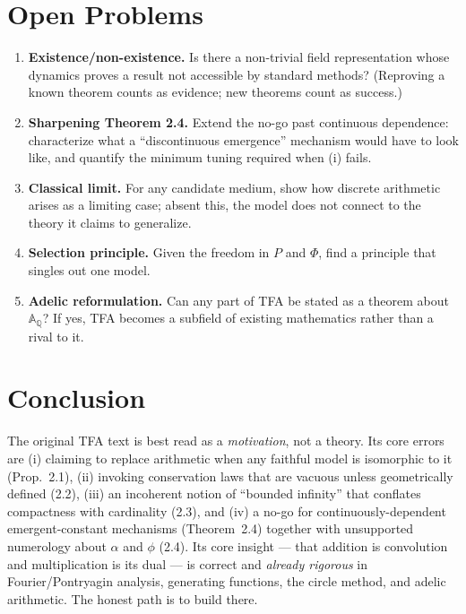 \documentclass[11pt]{article}
\begin{document}
\section{Open Problems}

\begin{enumerate}[leftmargin=1.6em]
\item \textbf{Existence/non-existence.} Is there a non-trivial field
representation whose dynamics proves a result not accessible by standard methods?
(Reproving a known theorem counts as evidence; new theorems count as success.)
\item \textbf{Sharpening Theorem 2.4.} Extend the no-go past continuous
dependence: characterize what a ``discontinuous emergence'' mechanism would have
to look like, and quantify the minimum tuning required when (i) fails.
\item \textbf{Classical limit.} For any candidate medium, show how discrete
arithmetic arises as a limiting case; absent this, the model does not connect to
the theory it claims to generalize.
\item \textbf{Selection principle.} Given the freedom in $P$ and $\Phi$, find a
principle that singles out one model.
\item \textbf{Adelic reformulation.} Can any part of TFA be stated as a theorem
about $\mathbb{A}_{\mathbb{Q}}$? If yes, TFA becomes a subfield of existing
mathematics rather than a rival to it.
\end{enumerate}

\section{Conclusion}

The original TFA text is best read as a \emph{motivation}, not a theory. Its core
errors are (i) claiming to replace arithmetic when any faithful model is
isomorphic to it (Prop.~2.1), (ii) invoking conservation laws that are vacuous
unless geometrically defined (2.2), (iii) an incoherent notion of ``bounded
infinity'' that conflates compactness with cardinality (2.3), and (iv) a no-go for
continuously-dependent emergent-constant mechanisms (Theorem~2.4) together with
unsupported numerology about $\alpha$ and $\phi$ (2.4). Its core insight --- that
addition is convolution and multiplication is its dual --- is correct and
\emph{already rigorous} in Fourier/Pontryagin analysis, generating functions, the
circle method, and adelic arithmetic. The honest path is to build there.
\end{document}
